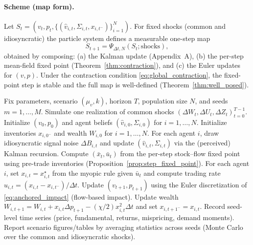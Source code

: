 
\paragraph{Scheme (map form).}
Let $S_t=(v_t,p_t,\{(\hat v_{i,t},\Sigma_{i,t},x_{i,t^-})\}_{i=1}^N)$. For fixed shocks (common and idiosyncratic) the particle system defines a measurable one-step map
\begin{equation}
S_{t+1}=\Psi_{\Delta t,N}(S_t;\text{shocks}),
\end{equation}
obtained by composing: (a) the Kalman update (Appendix~A), (b) the per-step mean-field fixed point (Theorem~\ref{thm:contraction}), and (c) the Euler updates for $(v,p)$. Under the contraction condition \eqref{eq:global_contraction}, the fixed-point step is stable and the full map is well-defined (Theorem~\ref{thm:well_posed}).

\begin{algorithm}[t]
\caption{Particle approximation (one scenario)}
\label{alg:particle}
\begin{algorithmic}[1]
\STATE Fix parameters, scenario $(\mu_v,k)$, horizon $T$, population size $N$, and seeds $m=1,\dots,M$.
  \STATE Simulate one realization of common shocks $(\Delta W_t,\Delta U_t,\Delta Z_t)_{t=0}^{T-1}$.
  \STATE Initialize $(v_0,p_0)$ and agent beliefs $(\hat v_{i,0},\Sigma_{i,0})$ for $i=1,\dots,N$.
  \STATE Initialize inventories $x_{i,0^-}$ and wealth $W_{i,0}$ for $i=1,\dots,N$.
    \STATE For each agent $i$, draw idiosyncratic signal noise $\Delta B_{i,t}$ and update $(\hat v_{i,t},\Sigma_{i,t})$ via the (perceived) Kalman recursion.
    \STATE Compute $(\bar x_t,\bar u_t)$ from the per-step stock--flow fixed point using pre-trade inventories (Proposition~\ref{prop:step_fixed_point}).
    \STATE For each agent $i$, set $x_{i,t}=x^\star_{i,t}$ from the myopic rule given $\bar u_t$ and compute trading rate $u_{i,t}=(x_{i,t}-x_{i,t^-})/\Delta t$.
    \STATE Update $(v_{t+1},p_{t+1})$ using the Euler discretization of \eqref{eq:anchored_impact} (flow-based impact).
    \STATE Update wealth $W_{i,t+1}=W_{i,t}+x_{i,t}\Delta p_{t+1}-(\chi/2)x_{i,t}^2\Delta t$ and set $x_{i,t+1^-}=x_{i,t}$.
  \ENDFOR
  \STATE Record seed-level time series (price, fundamental, returns, mispricing, demand moments).
\ENDFOR
\STATE Report scenario figures/tables by averaging statistics across seeds (Monte Carlo over the common and idiosyncratic shocks).
\end{algorithmic}
\end{algorithm}


